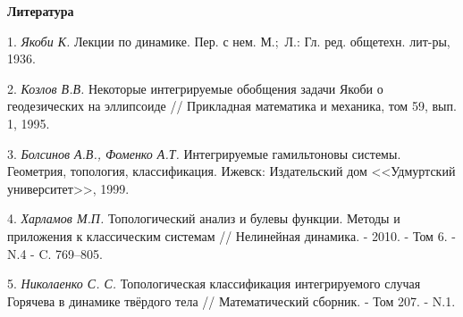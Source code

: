 \smallskip \centerline{\bf Литература}\nopagebreak

1.  {\it Якоби К.} Лекции по динамике. Пер. с нем. М.;~Л.: Гл. ред. общетехн. лит-ры, 1936.

2.  {\it Козлов В.В.} Некоторые интегрируемые обобщения задачи Якоби о геодезических на эллипсоиде // Прикладная математика и механика, том 59, вып. 1, 1995.

3.  {\it Болсинов А.В., Фоменко А.Т.} Интегрируемые гамильтоновы системы. Геометрия, топология, классификация. Ижевск: Издательский дом <<Удмуртский университет>>, 1999.

4. {\it Харламов М.П.} Топологический анализ и булевы функции. Методы и приложения к классическим системам // Нелинейная динамика. - 2010. - Том 6. - N.4 - C. 769--805.

5. {\it Николаенко С. С.} Топологическая классификация интегрируемого случая Горячева в динамике твёрдого тела // Математический сборник. - Том 207. - N.1.

